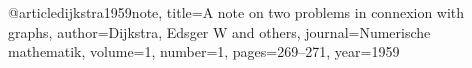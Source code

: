 @article{dijkstra1959note,
  title={A note on two problems in connexion with graphs},
  author={Dijkstra, Edsger W and others},
  journal={Numerische mathematik},
  volume={1},
  number={1},
  pages={269--271},
  year={1959}
}